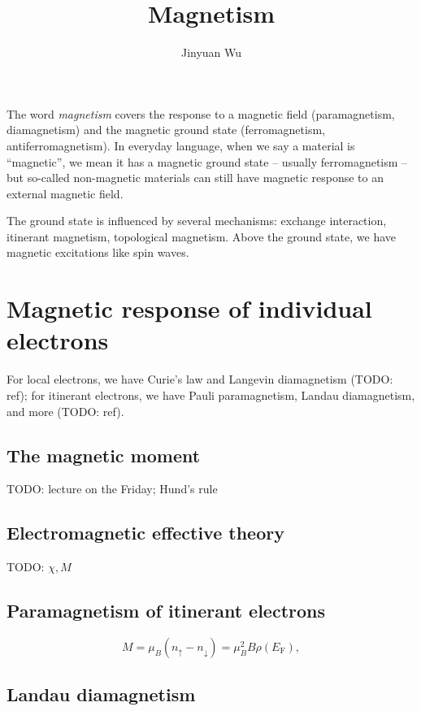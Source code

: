 \documentclass[hyperref, a4paper]{article}
\title{Magnetism}
\author{Jinyuan Wu}
\newcommand*{\term}[1]{\textit{#1}}
\newcommand*{\efermi}{E_{\text{F}}}
\begin{document}
\maketitle

The word \term{magnetism} covers the response to a magnetic field 
(paramagnetism, diamagnetism)
and the magnetic ground state 
(ferromagnetism, antiferromagnetism).
In everyday language,
when we say a material is ``magnetic'',
we mean it has a magnetic ground state -- usually ferromagnetism -- 
but so-called non-magnetic materials 
can still have magnetic response 
to an external magnetic field.

The ground state is influenced by several mechanisms:
exchange interaction, 
itinerant magnetism,
topological magnetism.
Above the ground state, we have magnetic excitations like spin waves.

\section{Magnetic response of individual electrons}

For local electrons, 
we have Curie's law and Langevin diamagnetism (TODO: ref);
for itinerant electrons,
we have Pauli paramagnetism,
Landau diamagnetism, and more (TODO: ref). 

\subsection{The magnetic moment}

TODO: lecture on the Friday; Hund's rule 

\subsection{Electromagnetic effective theory}

TODO: $\chi, M$

\subsection{Paramagnetism of itinerant electrons}

\begin{equation}
    M = \mu_{B} (n_\uparrow - n_\downarrow) = \mu_B^2 B \rho(\efermi),
\end{equation}

\subsection{Landau diamagnetism}
\end{document}
